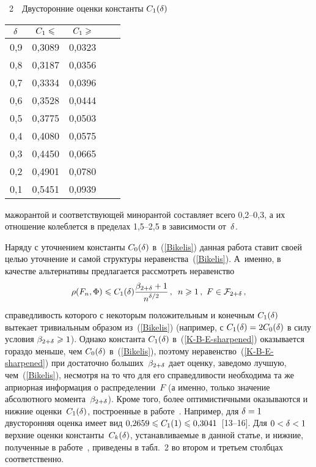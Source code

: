 \begin{multicols}{2}
\begin{center} %
\noindent
\parbox{56mm}{{\tablename~2}\ \ \small{Двусторонние оценки
константы $C_1(\delta)$}}
\vspace*{4pt}

{\small 
\tabcolsep=16pt
\begin{tabular}{|c|c|c|c|c|}
\hline \vphantom{$\frac{\displaystyle R}2$}
  $\delta$ & $C_1\leqslant$ & $C_1\geqslant$ \\
\hline
0,9 &0,3089 &0,0323 \\
0,8 &0,3187 &0,0356 \\
0,7 &0,3334 &0,0396 \\
0,6 &0,3528 &0,0444 \\
0,5 &0,3775 &0,0503 \\
0,4 &0,4080 &0,0575 \\
0,3 &0,4450 &0,0665 \\
0,2 &0,4901 &0,0780 \\
0,1 &0,5451 &0,0939 \\
  \hline
\end{tabular}
}
\end{center}

\addtocounter{table}{2}

\bigskip

\noindent
 мажорантой и соответствующей минорантой со\-став\-ля\-ет всего
0,2--0,3, а их отношение колеблется в пределах 1,5--2,5 в
зависимости от~$\delta$.


Наряду с уточнением константы $C_0(\delta)$ в~(\ref{Bikelis}) данная
работа ставит своей целью уточнение и самой структуры
неравенства~(\ref{Bikelis}). А~именно, в качестве альтернативы
предлагается рассмотреть неравенство
\begin{equation}
\label{K-B-E-sharpened}
\rho(F_n,\Phi)\leqslant C_1(\delta)\displaystyle\frac{\displaystyle \beta_{2+\delta}+1\mathstrut}{\displaystyle n^{\delta/2}\mathstrut}\,,\enskip n\geqslant1\,,\
F\in{\mathcal F}_{2+\delta}\,,
\end{equation}
справедливость которого с некоторым положительным и конечным
$C_1(\delta)$ вытекает тривиальным образом из~(\ref{Bikelis})
(например, с $C_1(\delta)=2C_0(\delta)$ в силу условия $\beta_{2+\delta}\geqslant1$).
Однако константа $C_1(\delta)$ в~(\ref{K-B-E-sharpened})\linebreak
 оказывается
гораздо меньше, чем $C_0(\delta)$ в~(\ref{Bikelis}), поэтому
неравенство~(\ref{K-B-E-sharpened}) при достаточно больших~$\beta_{2+\delta}$
дает оценку, заведомо лучшую, чем~(\ref{Bikelis}), несмотря на то
что для его справедливости необходима та же априорная информация о
распределении~$F$ (а именно, только значение абсолютного момента~$\beta_{2+\delta}$). 
Кроме того, более оптимистичными оказываются и нижние
оценки~$C_1(\delta)$, построенные в работе~\cite{Shevtsova2010}.
Например, для $\delta=1$ двусторонняя оценка имеет вид
$0{,}2659\leqslant C_1(1)\leqslant 0{,}3041$~[13--16]. Для $0<\delta<1$ верхние
оценки константы~$C_k(\delta)$, устанавливаемые в данной статье, и
нижние, полученные в
работе~\cite{Shevtsova2010}, приведены в
табл.~2 во втором и третьем
столбцах соответст\-венно.



\end{multicols}
